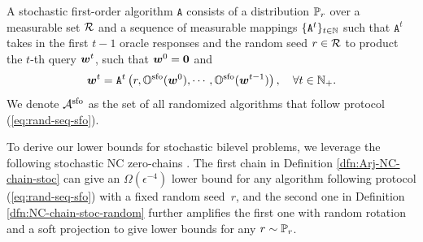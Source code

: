 \documentclass{article}
\begin{document}
\begin{dfn} \label{dfn:rand-alg-sfo}
A stochastic first-order algorithm $\texttt{A}$ consists of a distribution ${\mathbb{P}}_r$ over a measurable set ${\mathcal{R}}$ and a sequence of measurable mappings $\{ \texttt{A}^{t}\}_{t \in {\mathbb{N}}}$ such that $ \texttt{A}^{t}$ takes in the first $t-1$ oracle responses and the random seed $r \in {\mathcal{R}}$ to product the $t$-th query ${\bm{w}}^t$, such that ${\bm{w}}^0 = {\bm{0}}$ and  
\begin{align}  \label{eq:rand-seq-sfo}
    {\bm{w}}^t = \texttt{A}^t \left(r, {\mathbb{O}}^{\rm sfo}({\bm{w}}^0), \cdots, {\mathbb{O}}^{\rm sfo}({\bm{w}}^{t-1}) \right), \quad \forall t \in {\mathbb{N}}_+.
\end{align}                      
We denote ${\mathcal{A}}^{{\rm sfo}}$ as the set of all randomized algorithms that follow protocol (\ref{eq:rand-seq-sfo}).
\end{dfn}


To derive our lower bounds for stochastic bilevel problems, we 
leverage the following stochastic NC zero-chains \citep{arjevani2023lower}.
The first chain in Definition \ref{dfn:Arj-NC-chain-stoc} can give an $\Omega(\epsilon^{-4})$ lower bound for any algorithm following protocol (\ref{eq:rand-seq-sfo}) with a fixed random seed~$r$, and the second one in Definition \ref{dfn:NC-chain-stoc-random} further amplifies the first one with random rotation and a soft projection to give lower bounds for any $r \sim {\mathbb{P}}_r$.
\end{document}
